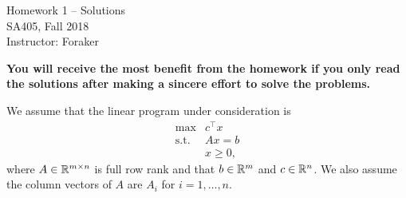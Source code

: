 \documentclass[10pt]{article}
\begin{document}
\begin{center}
  {\sc Homework 1 -- Solutions}\\
  {\sc SA405, Fall 2018} \\
  {\sc Instructor: Foraker}
\end{center}

\medskip

{\bf You will receive the most benefit from the homework if you only
  read the solutions after making a sincere effort to solve the problems.}

\medskip

We assume that the linear program under consideration is
\[
\begin{array}{ll}
  \max & c^\top x \\
  \mbox{s.t.} & A x = b \\
  & x \geq 0,
\end{array}
\]
where $A \in {\mathbb R}^{m \times n}$ is full row rank and that $b \in {\mathbb R}^m$
and $c \in {\mathbb R}^n$. We also assume the column vectors of $A$ are $A_i$
for $i = 1,\ldots,n$.
\end{document}
